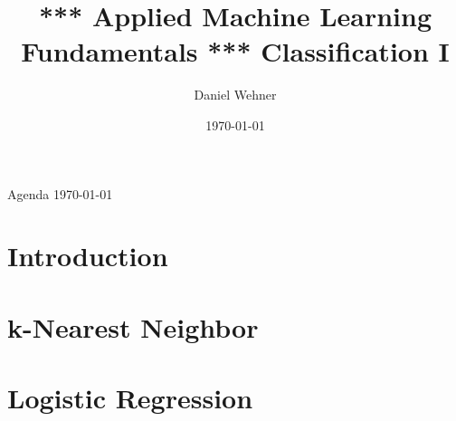 


\title[Classification I]{*** Applied Machine Learning Fundamentals *** Classification I}
\author{Daniel Wehner}
\date{\today}




\maketitlepage


\begin{frame}{Agenda \today}
	\begin{multicols}{2}
		\tableofcontents
	\end{multicols}
\end{frame}


\section{Introduction}

\begin{frame}{}{}

\end{frame}


\section{k-Nearest Neighbor}

\begin{frame}{}{}

\end{frame}


\section{Logistic Regression}

